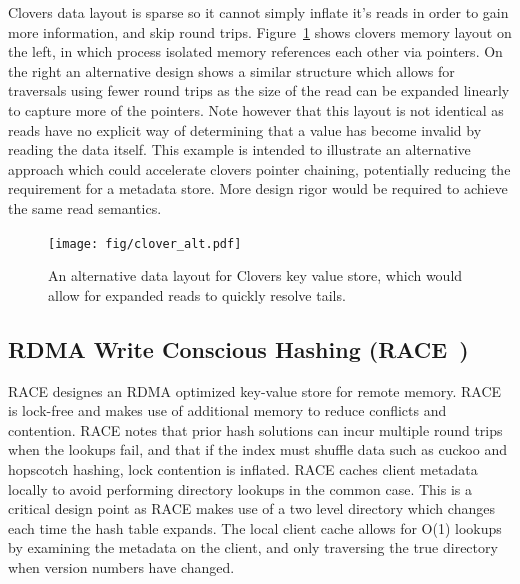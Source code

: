 Clovers data layout is sparse so it cannot simply inflate it's reads in order to
gain more information, and skip round trips. Figure~\ref{fig:clover_alt} shows
clovers memory layout on the left, in which process isolated memory references
each other via pointers. On the right an alternative design shows a similar
structure which allows for traversals using fewer round trips as the size of the
read can be expanded linearly to capture more of the pointers. Note however that
this layout is not identical as reads have no explicit way of determining that a
value has become invalid by reading the data itself. This example is intended to
illustrate an alternative approach which could accelerate clovers pointer
chaining, potentially reducing the requirement for a metadata store. More design
rigor would be required to achieve the same read semantics.


\begin{figure}
    \texttt{[image: fig/clover\_alt.pdf]}

    \caption{An alternative data layout for Clovers key value store, which would
    allow for expanded reads to quickly resolve tails.}

    \label{fig:clover_alt}
\end{figure}


\subsection{RDMA Write Conscious Hashing (RACE~\cite{one-sided-hash})}

RACE designes an RDMA optimized key-value store for remote memory. RACE is
lock-free and makes use of additional memory to reduce conflicts and contention.
RACE notes that prior hash solutions can incur multiple round trips when the
lookups fail, and that if the index must shuffle data such as cuckoo and
hopscotch hashing, lock contention is inflated. RACE caches client metadata
locally to avoid performing directory lookups in the common case. This is a
critical design point as RACE makes use of a two level directory which changes
each time the hash table expands. The local client cache allows for O(1) lookups
by examining the metadata on the client, and only traversing the true directory
when version numbers have changed.

